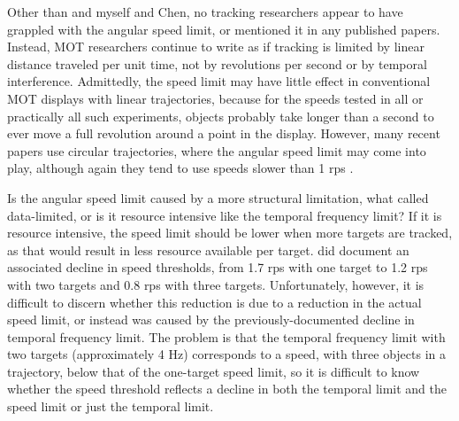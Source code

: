 \documentclass[
]{book}
\begin{document}
Other than \citet{verstratenLimitsAttentiveTracking2000} and myself and Chen, no tracking researchers appear to have grappled with the angular speed limit, or mentioned it in any published papers. Instead, MOT researchers continue to write as if tracking is limited by linear distance traveled per unit time, not by revolutions per second or by temporal interference. Admittedly, the speed limit may have little effect in conventional MOT displays with linear trajectories, because for the speeds tested in all or practically all such experiments, objects probably take longer than a second to ever move a full revolution around a point in the display. However, many recent papers use circular trajectories, where the angular speed limit may come into play, although again they tend to use speeds slower than 1 rps \citep[e.g.][\citet{carlsonQuadranticDeficitReveals2007}]{maechlerAttentionalTrackingTakes2021}.

Is the angular speed limit caused by a more structural limitation, what \citet{normanDatalimitedResourcelimitedProcesses1975} called data-limited, or is it resource intensive like the temporal frequency limit? If it is resource intensive, the speed limit should be lower when more targets are tracked, as that would result in less resource available per target. \citet{holcombeSplittingAttentionReduces2013} did document an associated decline in speed thresholds, from 1.7 rps with one target to 1.2 rps with two targets and 0.8 rps with three targets. Unfortunately, however, it is difficult to discern whether this reduction is due to a reduction in the actual speed limit, or instead was caused by the previously-documented decline in temporal frequency limit. The problem is that the temporal frequency limit with two targets (approximately 4 Hz) corresponds to a speed, with three objects in a trajectory, below that of the one-target speed limit, so it is difficult to know whether the speed threshold reflects a decline in both the temporal limit and the speed limit or just the temporal limit.
\end{document}
